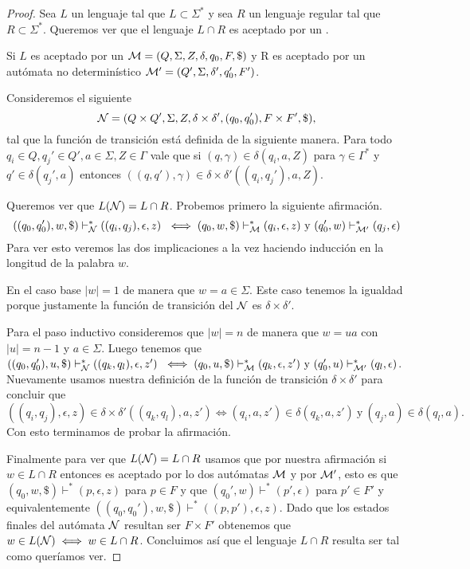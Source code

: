 \documentclass[tesis.tex]{subfiles}
\begin{document}
\begin{proof}
	Sea $L$ un lenguaje \ic tal que $L \subset \Sigma^*$ y sea $R$ un lenguaje regular tal que $R \subset \Sigma^*$. 
	Queremos ver que el lenguaje $L \cap R$ es aceptado por un \APND.
	
	Si $L$ es aceptado por un \APND ${\cal M } = (Q, \Sigma, Z, \delta, q_0, F, \$)$ y R es aceptado por un autómata no determinístico ${\cal M' } = (Q', \Sigma, \delta', q_0', F')$.
	
	Consideremos el siguiente \APND
	\[
		{\cal N } = (Q \times Q', \Sigma, Z, \delta \times \delta', (q_0,q_0'), F \times F', \$),
	\]	
	tal que la función de transición está definida de la siguiente manera.
	Para todo $q_{i} \in Q, q_{j}' \in Q', a \in \Sigma, Z \in \Gamma$ vale que
	si $(q,\gamma) \in \delta(q_{i},a,Z)$ para $\gamma \in \Gamma^*$ y $q'  \in \delta(q_{j}', a)$ entonces $ ((q,q'), \gamma) \in \delta \times \delta'((q_{i},q_{j}'),a,Z)$.
	
	
	Queremos ver que $L({\cal N}) = L \cap R $.	
	Probemos primero la siguiente afirmación.
	\[
	((q_0,q_0'), w, \$) \vdash^*_{\cal N}  ((q_i,q_j), \epsilon, z) \ \iff (q_0, w, \$) \vdash^*_{\cal M}  (q_i, \epsilon, z) \ \text{y} \ (q_0', w) \vdash^*_{\cal M'} (q_j, \epsilon)  	
	\]
	Para ver esto veremos las dos implicaciones a la vez haciendo inducción en la longitud de la palabra $w$.
	
	En el caso base $|w| = 1$ de manera que $w = a \in \Sigma$.
	Este caso tenemos la igualdad porque justamente la función de transición del \APND $\cal N$ es $\delta \times \delta'$.
	
	Para el paso inductivo consideremos que $|w|=n$ de manera que $w=ua$ con $|u|=n-1$ y $a \in \Sigma$.
	Luego tenemos que $((q_0,q_0'), u, \$) \vdash^*_{\cal N}  ((q_k,q_l), \epsilon, z') \ \iff (q_0, u, \$) \vdash^*_{\cal M}  (q_k, \epsilon, z') \ \text{y} \ (q_0', u) \vdash^*_{\cal M'} (q_l, \epsilon)$.
	Nuevamente usamos nuestra definición de la función de transición $\delta \times \delta'$ para concluir que
	\[ 
	((q_i,q_j),\epsilon, z) \in \delta \times \delta'((q_k,q_l), a, z') \iff  (q_i, a, z') \in \delta(q_k, a, z') \ \text{y} \ (q_j, a) \in \delta(q_l, a).
	\]	
	Con esto terminamos de probar la afirmación.
	
	Finalmente para ver que $L({\cal N})  =  L \cap R$ usamos que por nuestra afirmación si $w \in L \cap R$ entonces es aceptado por lo dos autómatas $\cal M$ y por $\cal M'$, esto es que $(q_0, w, \$) \vdash^* (p, \epsilon, z)$ para $p \in F$ y que $(q_0', w) \vdash^* (p', \epsilon)$ para $p' \in F'$ y equivalentemente $((q_0,q_0'),w,\$) \vdash^* ((p, p'),\epsilon, z)$. 
	Dado que los estados finales del autómata $\cal N$ resultan ser $F \times F'$ obtenemos que $w \in L({\cal N}) \iff w \in L \cap R$.
	Concluimos así que el lenguaje $L \cap R$ resulta ser \ic tal como queríamos ver.		
\end{proof}
\end{document}
